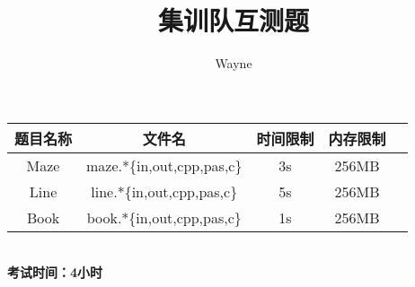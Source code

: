 \documentclass[a4paper]{article}
\begin{document}
\title{集训队互测题}
\author{Wayne}
\maketitle
\begin{center}
\begin{tabular}{|c|c|c|c|c|}
\hline
题目名称 & 文件名 & 时间限制 & 内存限制 \\ \hline
Maze & maze.*\{in,out,cpp,pas,c\} & 3s & 256MB \\ \hline
Line & line.*\{in,out,cpp,pas,c\} & 5s & 256MB \\ \hline
Book & book.*\{in,out,cpp,pas,c\} & 1s & 256MB \\ \hline
\end{tabular}
\vspace{15pt}
\\ {\large\textbf{考试时间：4小时}}
\end{center}
\tableofcontents




\end{document}
